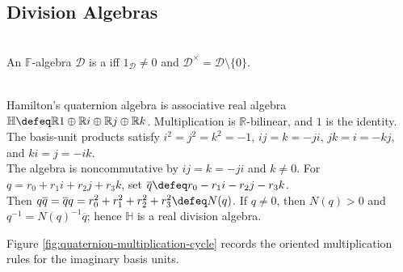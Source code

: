 \subsection{Division Algebras}

\begin{definition} \label{def:division-algebra} \\
An $\mathbb{F}$-algebra $\mathcal{D}$ is a  iff $1_{\mathcal{D}}\neq0$ and $\mathcal{D}^{\times}=\mathcal{D}\setminus\{0\}$.
\end{definition}

\begin{example} \label{ex:hamilton-quaternions} \\
Hamilton's quaternion algebra is associative real algebra $\mathbb{H}\defeq\mathbb{R}1\oplus\mathbb{R}i\oplus\mathbb{R}j\oplus\mathbb{R}k$. Multiplication is $\mathbb{R}$-bilinear, and $1$ is the identity.\\
The basis-unit products satisfy $i^2=j^2=k^2=-1$, $ij=k=-ji$, $jk=i=-kj$, and $ki=j=-ik$.\\
The algebra is noncommutative by $ij=k=-ji$ and $k\neq0$. For $q=r_0+r_1i+r_2j+r_3k$, set $\overline{q}\defeq r_0-r_1i-r_2j-r_3k$.\\
Then $q\overline{q}=\overline{q}q=r_0^2+r_1^2+r_2^2+r_3^2\defeq N(q)$. If $q\neq0$, then $N(q)>0$ and $q^{-1}=N(q)^{-1}\overline{q}$; hence $\mathbb{H}$ is a real division algebra.
\end{example}

Figure \ref{fig:quaternion-multiplication-cycle} records the oriented multiplication rules for the imaginary basis units.

\begin{illustrationfigure}[H]
  \centering
  
  \caption{Quaternion basis products. The cycle $i\to j\to k\to i$ encodes
  $ij=k$, $jk=i$, and $ki=j$; reversed order negates each product.
  Each imaginary basis unit squares to $-1$, and $1$ is the identity.}
  \label{fig:quaternion-multiplication-cycle}
\end{illustrationfigure}

